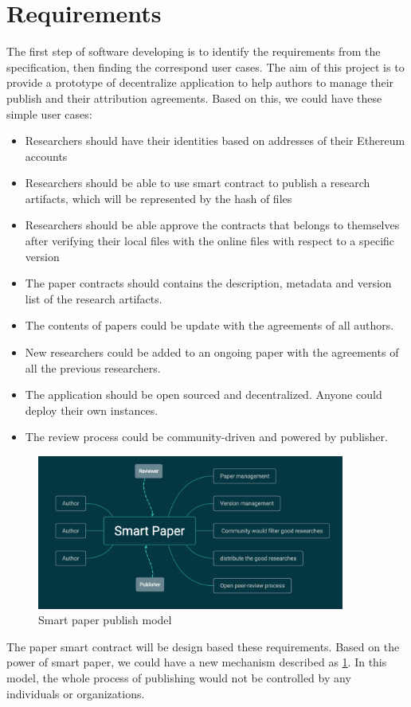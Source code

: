 \documentclass [12pt]{report}
\begin{document}
\section{Requirements}
The first step of software developing is to identify the requirements from the specification,
then finding the correspond user cases.
The aim of this project is to provide a prototype of decentralize application 
to help authors to manage their publish and their attribution agreements.
Based on this, we could have these simple user cases:
\begin{itemize}
  \item Researchers should have their identities based on addresses of their Ethereum accounts
  \item Researchers should be able to use smart contract to publish a research artifacts, which will be represented by the hash of files
  \item Researchers should be able approve the contracts that belongs to themselves after verifying their local files with the online files with respect to a specific version
  \item The paper contracts should contains the description, metadata and version list of the research artifacts.
  \item The contents of papers could be update with the agreements of all authors. 
  \item New researchers could be added to an ongoing paper with the agreements of all the previous researchers.
  \item The application should be open sourced and decentralized. Anyone could deploy their own instances.
  \item The review process could be community-driven and powered by publisher.
\end{itemize}
\begin{figure}[H]
  \centering
  \includegraphics[width=0.9\textwidth]{smartPaperModel.png}
  \caption{Smart paper publish model}
  \label{smartPaper}
\end{figure}
The paper smart contract will be design based these requirements. 
Based on the power of smart paper, we could have a new mechanism described as \ref{smartPaper}. 
In this model, the whole process of publishing would not be controlled by any individuals or organizations.
\end{document}
